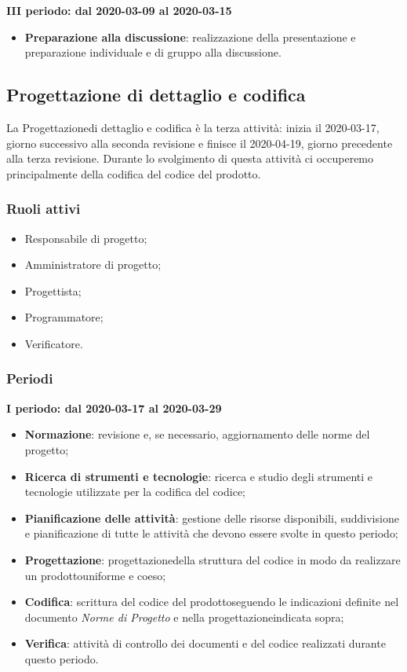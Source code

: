 \textbf{III periodo: dal 2020-03-09 al 2020-03-15}
\begin{itemize}
	\item \textbf{Preparazione alla discussione}: realizzazione della presentazione e preparazione individuale e di gruppo alla discussione.
\end{itemize}

\subsection{Progettazione di dettaglio e codifica}
La Progettazione\glosp di dettaglio e codifica è la terza attività: inizia il 2020-03-17, giorno successivo alla seconda revisione e finisce il 2020-04-19, giorno precedente alla terza revisione. Durante lo svolgimento di questa attività ci occuperemo principalmente della codifica del codice del prodotto\glo.

\subsubsection{Ruoli attivi}
\begin{itemize}
	\item Responsabile di progetto\glo;
	\item Amministratore di progetto\glo;
	\item Progettista;
	\item Programmatore;
	\item Verificatore.
\end{itemize}

\subsubsection{Periodi}
\textbf{I periodo: dal 2020-03-17 al 2020-03-29}
\begin{itemize}
	\item \textbf{Normazione}: revisione e, se necessario, aggiornamento delle norme del progetto\glo;
	\item \textbf{Ricerca di strumenti e tecnologie}: ricerca e studio degli strumenti e tecnologie utilizzate per la codifica del codice;
	\item \textbf{Pianificazione delle attività}: gestione delle risorse disponibili, suddivisione e pianificazione di tutte le attività che devono essere svolte in questo periodo;
	\item \textbf{Progettazione}\glo: progettazione\glosp della struttura del codice in modo da realizzare un prodotto\glosp uniforme e coeso;
	\item \textbf{Codifica}: scrittura del codice del prodotto\glosp seguendo le indicazioni definite nel documento \textit{Norme di Progetto} e nella progettazione\glosp indicata sopra; 
	\item \textbf{Verifica}: attività di controllo dei documenti e del codice realizzati durante questo periodo.
\end{itemize}

